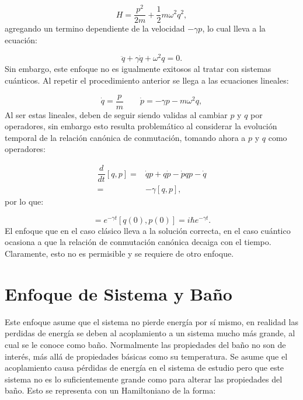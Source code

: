 \documentclass[a4paper,10pt]{report}
\begin{document}
\begin{equation}
H = \frac{p^2}{2m} + \frac{1}{2} m\omega^2 q^2,
\end{equation} agregando un termino dependiente de la velocidad $-\gamma p$, lo cual lleva a la ecuación:

\begin{equation}
\ddot{q} + \gamma \dot{q} + \omega^2 q = 0.
\end{equation} Sin embargo, este enfoque no es igualmente exitosos al tratar con sistemas cuánticos. Al repetir el procedimiento anterior se llega a las ecuaciones lineales:

\begin{equation}
\dot{q} = \frac{p}{m} \qquad \dot{p} = -\gamma p -m\omega ^2 q,
\end{equation}Al ser estas lineales, deben de seguir siendo validas al cambiar $p$ y $q$ por operadores, sin embargo esto resulta problemático al considerar la evolución temporal de la relación canónica de conmutación, tomando ahora a $p$ y $q$ como operadores:

\begin{align*}
 \dfrac{d}{dt}[q,p] =& \dot{q}p + q\dot{p} - \dot{p}q p-\dot{q}\\  
 =& -\gamma[q,p],
\end{align*}por lo que:

\begin{equation}
[q(t),p(t)] = e^{-\gamma t}[q(0),p(0)] = i\hbar e^{-\gamma t}.
\end{equation} El enfoque que en el caso clásico lleva a la solución correcta, en el caso cuántico ocasiona a que la relación de conmutación canónica decaiga con el tiempo. Claramente, esto no es permisible y se requiere de otro enfoque.

\section{Enfoque de Sistema y Baño}

Este enfoque asume que el sistema no pierde energía por sí mismo, en realidad las perdidas de energía se deben al acoplamiento a un sistema mucho más grande, al cual se le conoce como baño. Normalmente las propiedades del baño no son de interés, más allá de propiedades básicas como su temperatura. Se asume que el acoplamiento causa pérdidas de energía en el sistema de estudio pero que este sistema no es lo suficientemente grande como para alterar las propiedades del baño. Esto se representa con un Hamiltoniano de la forma:
\end{document}
